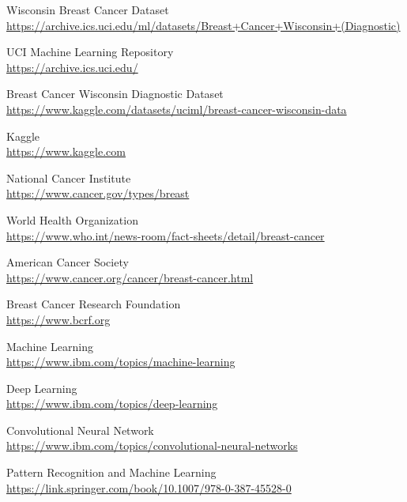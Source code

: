 \documentclass[12pt]{article}
\begin{document}
\begin{enumerate}[label={[\arabic*]}]
    \item Wisconsin Breast Cancer Dataset \\
    \url{https://archive.ics.uci.edu/ml/datasets/Breast+Cancer+Wisconsin+(Diagnostic)}
    
    \item UCI Machine Learning Repository \\
    \url{https://archive.ics.uci.edu/}
    
    \item Breast Cancer Wisconsin Diagnostic Dataset \\
    \url{https://www.kaggle.com/datasets/uciml/breast-cancer-wisconsin-data}
    
    \item Kaggle \\
    \url{https://www.kaggle.com}
    
    \item National Cancer Institute \\
    \url{https://www.cancer.gov/types/breast}
    
    \item World Health Organization \\
    \url{https://www.who.int/news-room/fact-sheets/detail/breast-cancer}
    
    \item American Cancer Society \\
    \url{https://www.cancer.org/cancer/breast-cancer.html}
    
    \item Breast Cancer Research Foundation \\
    \url{https://www.bcrf.org}
    
    \item Machine Learning \\
    \url{https://www.ibm.com/topics/machine-learning}
    
    \item Deep Learning \\
    \url{https://www.ibm.com/topics/deep-learning}
    
    \item Convolutional Neural Network \\
    \url{https://www.ibm.com/topics/convolutional-neural-networks}
    
    \item Pattern Recognition and Machine Learning \\
    \url{https://link.springer.com/book/10.1007/978-0-387-45528-0}
    

\end{enumerate}
\end{document}
